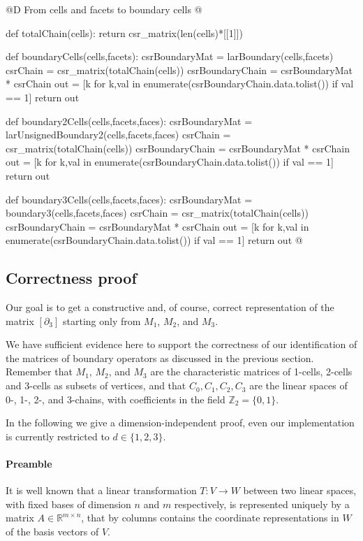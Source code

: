 \documentclass[11pt,oneside]{article}    %
\def\R{\mathbb{R}}
\def\Z{\mathbb{Z}}
\begin{document}
@D From cells and facets to boundary cells
@{def totalChain(cells):
    return csr_matrix(len(cells)*[[1]])

def boundaryCells(cells,facets):
    csrBoundaryMat = larBoundary(cells,facets)
    csrChain = csr_matrix(totalChain(cells))
    csrBoundaryChain = csrBoundaryMat * csrChain
    out = [k for k,val in enumerate(csrBoundaryChain.data.tolist()) if val == 1]
    return out

def boundary2Cells(cells,facets,faces):
    csrBoundaryMat = larUnsignedBoundary2(cells,facets,faces)
    csrChain = csr_matrix(totalChain(cells))
    csrBoundaryChain = csrBoundaryMat * csrChain
    out = [k for k,val in enumerate(csrBoundaryChain.data.tolist()) if val == 1]
    return out

def boundary3Cells(cells,facets,faces):
    csrBoundaryMat = boundary3(cells,facets,faces)
    csrChain = csr_matrix(totalChain(cells))
    csrBoundaryChain = csrBoundaryMat * csrChain
    out = [k for k,val in enumerate(csrBoundaryChain.data.tolist()) if val == 1]
    return out
@}


\subsection{Correctness proof}

Our goal is to get a constructive and, of course, correct representation of the matrix $[\partial_3]$ starting only from $M_1$, $M_2$, and $M_3$.

We have sufficient evidence here to support the correctness of our identification of the matrices of boundary operators as discussed in the previous section. Remember that $M_1$, $M_2$, and $M_3$ are the characteristic matrices of 1-cells, 2-cells and 3-cells as subsets of vertices, and that $C_0, C_1, C_2, C_3$ are the linear spaces of 0-, 1-, 2-, and 3-chains, with coefficients in the field $\Z_2=\{0,1\}$.

In the following we give a dimension-independent proof, even our implementation is currently restricted to $d\in\{1,2,3\}$.

\paragraph{Preamble}
It is well known that a linear transformation $T: V\to W$ between two linear spaces, with fixed bases  of dimension $n$ and $m$ respectively, is represented uniquely by a matrix $A\in \R^{m\times n}$, that by columns contains the coordinate representations in $W$ of the basis vectors of $V$. 
\end{document}
